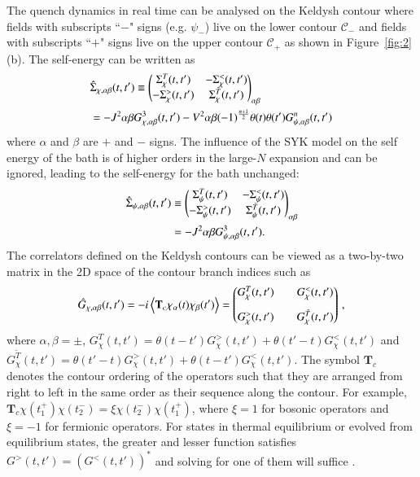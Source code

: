 \documentclass[prl,superscriptaddress,notitlepage,showpacs,twocolumn]{revtex4-2}
\begin{document}
The quench dynamics in real time can be analysed on the Keldysh contour where fields with subscripts ``$-$" signs (e.g. $\psi_-$) live on the lower contour $\mathcal{C}_-$ and fields with subscripts ``$+$" signs live on the upper contour $\mathcal{C}_+$ as shown in Figure~\ref{fig:2}(b). The self-energy can be written as \cite{zhang2019evaporation}
\begin{align}
&\hat\Sigma_{\chi,\alpha\beta}(t,t')\equiv\begin{pmatrix}
\Sigma_\chi^{T}(t,t')&-\Sigma_\chi^{<}(t,t')\\
-\Sigma_\chi^{>}(t,t')&\Sigma_\chi^{\tilde{T}}(t,t')
\end{pmatrix}_{\alpha\beta}\notag\\
&=-J^2\alpha \beta G^3_{\chi,\alpha\beta}(t,t')-V^2\alpha \beta (-1)^{\frac{n+1}{2}}\theta(t)\theta(t')G^{n}_{\psi,\alpha\beta}(t,t')
\end{align}
where $\alpha$ and $\beta$ are $+$ and $-$ signs. The influence of the SYK model on the self energy of the bath is of higher orders in the large-$N$ expansion and can be ignored, leading to the self-energy for the bath unchanged:
\begin{align}
\hat\Sigma_{\psi,\alpha\beta}(t,t')&\equiv\begin{pmatrix}
\Sigma_\psi^{T}(t,t')&-\Sigma_\psi^{<}(t,t')\\
-\Sigma_\psi^{>}(t,t')&\Sigma_\psi^{\tilde{T}}(t,t')
\end{pmatrix}_{\alpha\beta}\notag \\ &=-J^2\alpha \beta G^3_{\psi,\alpha\beta}(t,t').
\end{align}
The correlators defined on the Keldysh contours can be viewed as a two-by-two matrix in the 2D space of the contour branch indices  \cite{babadi2015far} such as
\begin{align}
\hat{G}_{\chi,\alpha\beta}(t,t')=-i\left<\mathbf{T}_c \chi_\alpha(t)\chi_\beta(t')\right>=\begin{pmatrix}
G^{T}_\chi(t,t')&&G^{<}_\chi(t,t')\vspace{3mm}\\ 
G^{>}_\chi(t,t')&&G^{\tilde{T}}_\chi(t,t')
\end{pmatrix}\,,
\label{eq:grn}
\end{align}
where $\alpha,\beta=\pm$, $G^{T}_\chi(t,t')=\theta(t-t')G^{>}_\chi(t,t')+\theta(t'-t)G^{<}_\chi(t,t')$ and $G^{\tilde{T}}_\chi(t,t')=\theta(t'-t)G^{>}_\chi(t,t')+\theta(t-t')G^{<}_\chi(t,t')$.
The symbol $\mathbf{T}_c$ denotes the contour ordering of the  operators such that they are arranged from right to left in the same order as their sequence along the contour. For example, $\mathbf{T}_c \chi(t^+_1) \chi(t^-_2)=\xi \chi(t^-_2) \chi(t^+_1)$, where $\xi=1$ for bosonic operators and $\xi=-1$ for fermionic operators. For states in thermal equilibrium or evolved from equilibrium states, the greater and lesser function satisfies $G^>(t,t')=(G^<(t,t'))^*$ and solving for one of them will suffice \cite{babadi2015far,zanoci2022energy}. 
\end{document}
